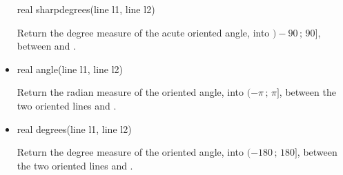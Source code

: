 \documentclass[pdftex]{article}
\begin{document}
\begin{itemize}
  \begin{Vcolor}
    real sharpdegrees(line l1, line l2)
  \end{Vcolor}
 Return the degree measure of the acute oriented angle, into
 $)-90\,;\,90]$, between  and .
\item {}%
  \begin{Vcolor}
    real angle(line l1, line l2)
  \end{Vcolor}
  Return the radian measure of the oriented angle, into
  $(-\pi\,;\,\pi]$, between the two oriented lines  and .
\item {}%
  \begin{Vcolor}
    real degrees(line l1, line l2)
  \end{Vcolor}
  Return the degree measure of the oriented angle, into
  $(-180\,;\,180]$, between the two oriented lines  and .
\end{itemize}
\end{document}
